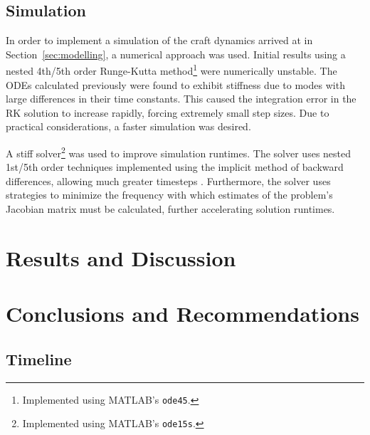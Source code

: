 \documentclass{sydeStyle}
\begin{document}
\section{Simulation}
In order to implement a simulation of the craft dynamics arrived at in
Section~\ref{sec:modelling}, a numerical approach was used.  Initial results
using a nested 4th/5th order Runge-Kutta method\footnote{Implemented using
MATLAB's \texttt{ode45}.} were numerically unstable.  The ODEs calculated
previously were found to exhibit stiffness due to modes with large differences
in their time constants.  This caused the integration error in the RK solution
to increase rapidly, forcing extremely small step sizes.  Due to practical
considerations, a faster simulation was desired.

A stiff solver\footnote{Implemented using MATLAB's \texttt{ode15s}.} was used to
improve simulation runtimes.  The solver uses nested 1st/5th order techniques
implemented using the implicit method of backward differences, allowing much
greater timesteps \cite{SR97}.  Furthermore, the solver uses strategies to
minimize the frequency with which estimates of the problem's Jacobian matrix
must be calculated, further accelerating solution runtimes.

\chapter{Results and Discussion}

\chapter{Conclusions and Recommendations}

\appendix

\section{Timeline}
\end{document}
